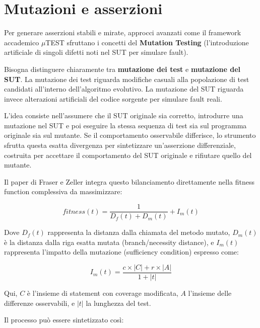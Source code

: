 \section{Mutazioni e asserzioni}

Per generare asserzioni stabili e mirate, approcci avanzati come il framework accademico $\mu$TEST sfruttano i concetti del \textbf{Mutation Testing} (l'introduzione artificiale di singoli difetti noti nel SUT per simulare fault).

\begin{notaesame}

Bisogna distinguere chiaramente tra \textbf{mutazione dei test} e \textbf{mutazione del SUT}. La mutazione dei test riguarda modifiche casuali alla popolazione di test candidati all'interno dell'algoritmo evolutivo. La mutazione del SUT riguarda invece alterazioni artificiali del codice sorgente per simulare fault reali.

\end{notaesame}

L'idea consiste nell'assumere che il SUT originale sia corretto, introdurre una mutazione nel SUT e poi eseguire la stessa sequenza di test sia sul programma originale sia sul mutante. Se il comportamento osservabile differisce, lo strumento sfrutta questa esatta divergenza per sintetizzare un'asserzione differenziale, costruita per accettare il comportamento del SUT originale e rifiutare quello del mutante.

Il paper di Fraser e Zeller integra questo bilanciamento direttamente nella fitness function complessiva da massimizzare:

\begin{equation}
fitness(t) = \frac{1}{D_f(t) + D_m(t)} + I_m(t)
\end{equation}

Dove $D_f(t)$ rappresenta la distanza dalla chiamata del metodo mutato, $D_m(t)$ è la distanza dalla riga esatta mutata (branch/necessity distance), e $I_m(t)$ rappresenta l'impatto della mutazione (sufficiency condition) espresso come:

\begin{equation}
I_m(t) = \frac{c \times |C| + r \times |A|}{1 + |t|}
\end{equation}

Qui, $C$ è l'insieme di statement con coverage modificata, $A$ l'insieme delle differenze osservabili, e $|t|$ la lunghezza del test.

Il processo può essere sintetizzato così:

